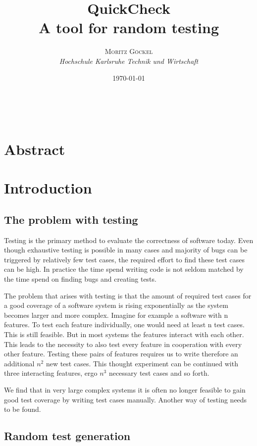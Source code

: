 \documentclass[a4paper, 12pt]{article} %
\title{\textbf{QuickCheck}\\ %
A tool for random testing} %
\author{\textsc{Moritz G\"ockel} %
\\{\textit{Hochschule Karlsruhe Technik und Wirtschaft}}} %
\date{\today}
\makeatletter
\renewcommand{\maketitle}{ 
\begin{flushright} %
{\LARGE\@title} %

\vspace{50pt} %

{\large\@author}
\\\@date 

\vspace{40pt}
\end{flushright}
}
\makeatother
\begin{document}
\maketitle

\vspace{30pt}

\newpage
\tableofcontents
\newpage

\section{Abstract}


\section{Introduction}
\subsection{The problem with testing}

Testing is the primary method to evaluate the correctness of software today. \cite{Ammann2016} Even though exhaustive testing is possible in many cases and majority of bugs can be triggered by relatively few test cases, \cite{Kuhn2004} the required effort to find these test cases can be high. In practice the time spend writing code is not seldom matched by the time spend on finding bugs and creating tests.

The problem that arises with testing is that the amount of required test cases for a good coverage of a software system is rising exponentially as the system becomes larger and more complex. Imagine for example a software with n features. To test each feature individually, one would need at least n test cases. This is still feasible. But in most systems the features interact with each other. This leads to the necessity to also test every feature in cooperation with every other feature. Testing these pairs of features requires us to write therefore an additional $n^2$  new test cases. This thought experiment can be continued with three interacting features, ergo $n^3$ necessary test cases and so forth. \cite{Hughes2016}

We find that in very large complex systems it is often no longer feasible to gain good test coverage by writing test cases manually. Another way of testing needs to be found. 

\subsection{Random test generation}
\end{document}
